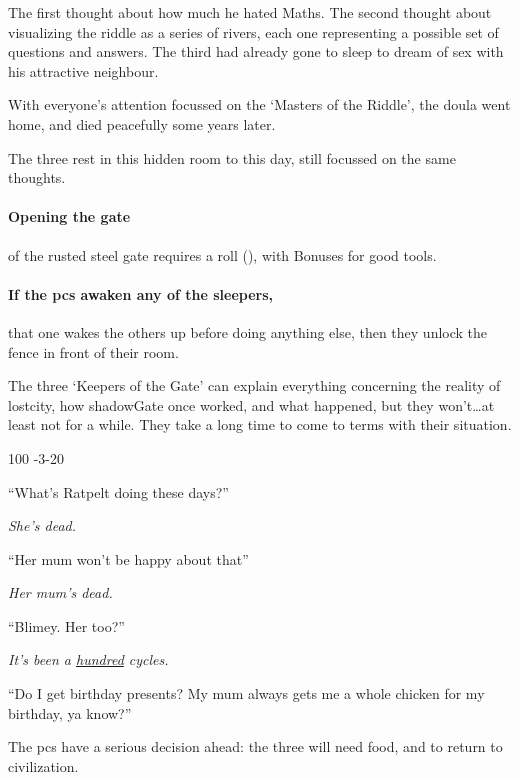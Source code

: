 \begin{multicols}{2}
\begin{exampletext}
  The first thought about how much he hated Maths.
  The second thought about visualizing the riddle as a series of rivers, each one representing a possible set of questions and answers.
  The third had already gone to sleep to dream of sex with his attractive neighbour.

  With everyone's attention focussed on the `Masters of the Riddle', the \gls{doula} went home, and died peacefully some years later.

  The three rest in this hidden room to this day, still focussed on the same thoughts.
\end{exampletext}

\paragraph{Opening the gate}
of the rusted steel gate requires a  roll (\tn[16]), with Bonuses for good tools.

\paragraph{If the \glspl{pc} awaken any of the sleepers,}
that one wakes the others up before doing anything else, then they unlock the fence in front of their room.

The three `Keepers of the Gate' can explain everything concerning the reality of \gls{lostcity}, how \gls{shadowGate} once worked, and what happened, but they won't\ldots at least not for a while.
They take a long time to come to terms with their situation.



%
  {{1}{0}{0}}%
  {{-3}{-2}{0}}%
  {%
    \Dagger
  }%
  {}%
  {\lootSmall}%
  {}%

\null
\begin{speechtext}
  ``What's Ratpelt doing these days?''

  \textit{\raggedleft{} She's dead.}

  ``Her mum won't be happy about that''

  \textit{\raggedleft{} Her mum's dead.}

  ``Blimey. Her too?''

  \textit{\raggedleft{} It's been a \underline{hundred} \glspl{cycle}.}

  ``Do I get birthday presents?
  My mum always gets me a whole chicken for my birthday, ya know?''
\end{speechtext}

The \glspl{pc} have a serious decision ahead: the three will need food, and to return to civilization.

\end{multicols}

